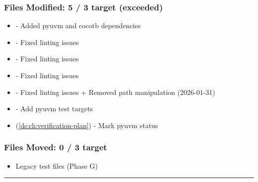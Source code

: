 \begin{record}
\end{record}

\subsubsection{Files Modified: 5 / 3 target (exceeded)}\label{cr:status:pyuvm-migration:files-modified-5-3-target-exceeded}

\begin{record}

\begin{itemize}
\tightlist
\item[$\boxtimes$]
   - Added pyuvm and cocotb dependencies
\item[$\boxtimes$]
   - Fixed linting issues
\item[$\boxtimes$]
   - Fixed linting issues
\item[$\boxtimes$]
   - Fixed linting issues
\item[$\boxtimes$]
   - Fixed linting issues +
  Removed path manipulation (2026-01-31)
\item[$\square$]
   - Add pyuvm test targets
\item[$\square$]
   (\cref{ds:ch:verification-plan}) - Mark pyuvm status
\end{itemize}

\end{record}

\subsubsection{Files Moved: 0 / 3 target}\label{cr:status:pyuvm-migration:files-moved-0-3-target}

\begin{record}

\begin{itemize}
\tightlist
\item[$\square$]
  Legacy test files (Phase G)
\end{itemize}

\begin{center}\rule{0.5\linewidth}{0.5pt}\end{center}

\end{record}

